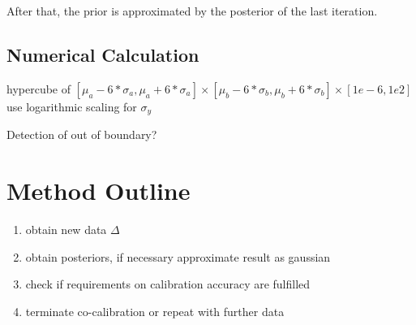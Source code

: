 \documentclass[10pt]{article}
\begin{document}
After that, the prior is approximated by the posterior of the last iteration.

\subsection{Numerical Calculation}
hypercube of $[\mu_a - 6 * \sigma_a, \mu_a + 6 * \sigma_a] \times [\mu_b - 6 * \sigma_b, \mu_b + 6 * \sigma_b] \times [1e-6, 1e2]$
use logarithmic scaling for $\sigma_y$

Detection of out of boundary?


\section{Method Outline}
\begin{enumerate}
    \item obtain new data $\Delta$
    \item obtain posteriors, if necessary approximate result as gaussian
    \item check if requirements on calibration accuracy are fulfilled
    \item terminate co-calibration or repeat with further data
\end{enumerate}



    
\end{document}
